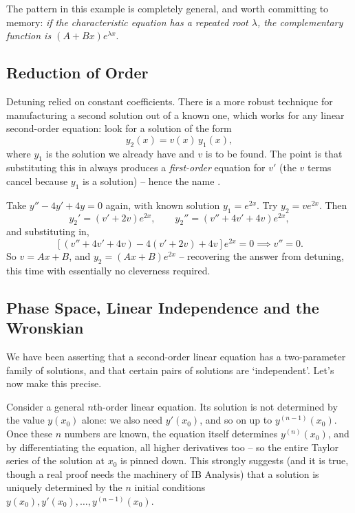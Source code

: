 The pattern in this example is completely general, and worth committing to memory: \emph{if the characteristic equation has a repeated root $\lambda$, the complementary function is $(A + Bx)e^{\lambda x}$}.

\subsection{Reduction of Order}

Detuning relied on constant coefficients. There is a more robust technique for manufacturing a second solution out of a known one, which works for any linear second-order equation: look for a solution of the form
$$
y_2(x) = v(x) \, y_1(x),
$$
where $y_1$ is the solution we already have and $v$ is to be found. The point is that substituting this in always produces a \emph{first-order} equation for $v'$ (the $v$ terms cancel because $y_1$ is a solution) -- hence the name .

\begin{example}
	Take $y'' - 4y' + 4y = 0$ again, with known solution $y_1 = e^{2x}$. Try $y_2 = v e^{2x}$. Then
	$$
	y_2' = (v' + 2v)e^{2x}, \qquad y_2'' = (v'' + 4v' + 4v)e^{2x},
	$$
	and substituting in,
	$$
	\left[(v'' + 4v' + 4v) - 4(v' + 2v) + 4v\right]e^{2x} = 0 \implies v'' = 0.
	$$
	So $v = Ax + B$, and $y_2 = (Ax + B)e^{2x}$ -- recovering the answer from detuning, this time with essentially no cleverness required.
\end{example}

\subsection{Phase Space, Linear Independence and the Wronskian}\label{sec:phase-space}

We have been asserting that a second-order linear equation has a two-parameter family of solutions, and that certain pairs of solutions are `independent'. Let's now make this precise.

Consider a general $n$th-order linear equation. Its solution is not determined by the value $y(x_0)$ alone: we also need $y'(x_0)$, and so on up to $y^{(n-1)}(x_0)$. Once these $n$ numbers are known, the equation itself determines $y^{(n)}(x_0)$, and by differentiating the equation, all higher derivatives too -- so the entire Taylor series of the solution at $x_0$ is pinned down. This strongly suggests (and it is true, though a real proof needs the machinery of IB Analysis) that a solution is uniquely determined by the $n$ initial conditions $y(x_0), y'(x_0), \dots, y^{(n-1)}(x_0)$.

